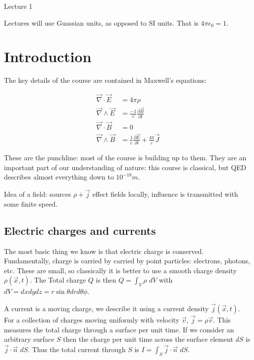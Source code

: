 \begin{center}

Lecture 1

\end{center}

Lectures will use Guassian units, as opposed to SI units. That is $4 \pi \epsilon_0 = 1$.

\section*{Introduction}

The key details of the course are contained in Maxwell's equations:

\begin{align*}
\vec{\nabla} \cdot \vec{E} &= 4 \pi \rho \\
\vec{\nabla} \wedge \vec{E} &= \frac{-1}{c} \frac{\partial \vec{B}}{\partial t} \\
\vec{\nabla} \cdot \vec{B} &= 0 \\
\vec{\nabla} \wedge \vec{B} &= \frac{1}{c} \frac{\partial \vec{E}}{\partial t} + \frac{4 \pi}{c} \vec{J}
\end{align*}


These are the punchline: most of the course is building up to them. They are an important part of our understanding of nature: this course is classical, but QED describes almost everything down to $10^{-18} m$.

Idea of a field: sources $\rho + \vec{j}$ effect fields locally, influence is transmitted with some finite speed.

\subsection*{Electric charges and currents}

The most basic thing we know is that electric charge is conserved. Fundamentally, charge is carried by carried by point particles: electrons, photons, etc. These are small, so classically it is better to use a smooth charge density $\rho (\vec{x}, t)$. The Total charge $Q$ is then $Q = \int_V \rho \,\, dV$ with $dV = dx dy dz = r \sin \theta dr d\theta \phi$.

A current is a moving charge, we describe it using a current density $\vec{j} (\vec{x}, t)$. For a collection of charges moving uniformly with velocity $\vec{v}$, $\vec{j} = \rho \vec{v}$. This measures the total charge through a surface per unit time. If we consider an arbitrary surface $S$ then the charge per unit time across the surface element $dS$ is $\vec{j} \cdot \vec{n} \, \, dS$. Thus the total current through $S$ is $I = \int_S \vec{j} \cdot \vec{n}  \, \,dS$. 

